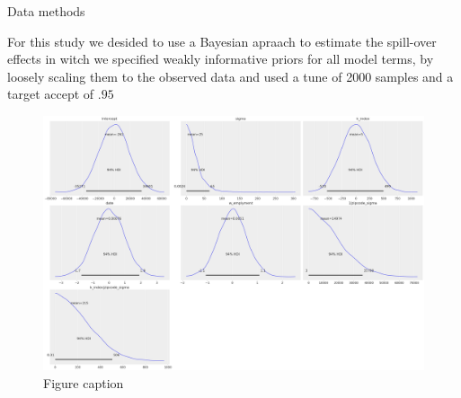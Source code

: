 \documentclass[final]{beamer}
\newlength{\onecolwid}
\newlength{\twocolwid}
\begin{document}
\begin{frame}[t]
\begin{columns}[t]
\begin{column}{\twocolwid}
\begin{columns}[t,totalwidth=\twocolwid]
\begin{column}{\onecolwid}

					\begin{block}{Data methods}

						For this study we desided to use a Bayesian apraach to estimate the spill-over effects in witch we specified weakly informative priors for all model terms,
						by loosely scaling them to the observed data and used a tune of 2000 samples and a target accept of $.95$
						\begin{figure}
							\includegraphics[width=0.8\linewidth]{priori.png}
							\caption{Figure caption}
						\end{figure}
					\end{block}


				\end{column} %

			\end{columns} %




			\begin{columns}[t,totalwidth=\twocolwid] %

				\begin{column}{\onecolwid} %



\end{column}
\end{columns}
\end{column}
\end{columns}
\end{frame}
\end{document}
